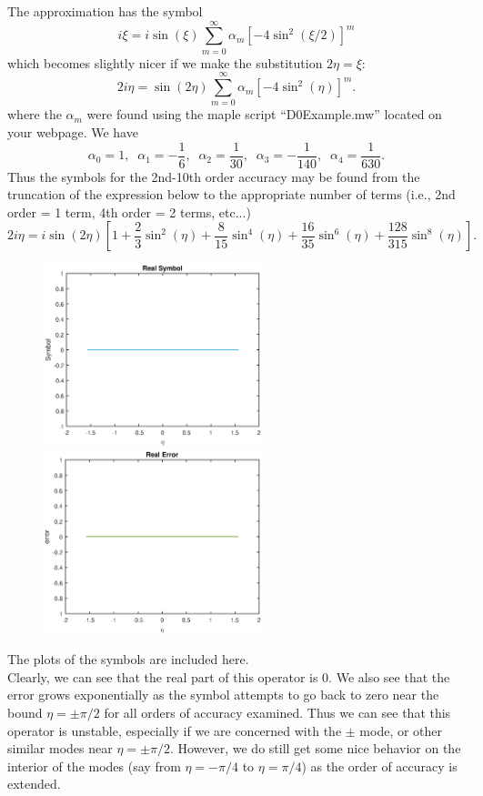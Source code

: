 The approximation has the symbol
$$i\xi =i \sin(\xi)\sum_{m=0}^\infty \alpha_m[-4\sin^2(\xi/2)]^m$$
which becomes slightly nicer if we make the substitution $2\eta = \xi$:
$$2i\eta = \sin(2\eta)\sum_{m=0}^\infty \alpha_m[-4\sin^2(\eta)]^m.$$
where the $\alpha_m$ were found using the maple script ``D0Example.mw'' located on your webpage. We have
$$\alpha_0=1,\;\;\alpha_1 = -\frac{1}{6},\;\; \alpha_2 = \frac{1}{30},\;\; \alpha_3 = -\frac{1}{140},\;\; \alpha_4 = \frac{1}{630}.$$
Thus the symbols for the 2nd-10th order accuracy may be found from the truncation of the expression below to the appropriate number of terms (i.e., 2nd order = 1 term, 4th order = 2 terms, etc...)
$$2i\eta = i\sin(2\eta)\left[1+\frac{2}{3}\sin^2(\eta)+\frac{8}{15}\sin^4(\eta)+\frac{16}{35}\sin^6(\eta)+\frac{128}{315}\sin^8(\eta)\right].$$
\begin{figure}[h]
\centering
\includegraphics[width=2.5in]{real_sym1}
\includegraphics[width=2.5in]{real_err1}
\end{figure}
The plots of the symbols are included here.\\
Clearly, we can see that the real part of this operator is 0. We also see that the error grows exponentially as the symbol attempts to go back to zero near the bound $\eta = \pm\pi/2$ for all orders of accuracy examined. Thus we can see that this operator is unstable, especially if we are concerned with the $\pm$ mode, or other similar modes near $\eta = \pm \pi/2.$ However, we do still get some nice behavior on the interior of the modes (say from $\eta=-\pi/4$ to $\eta=\pi/4$) as the order of accuracy is extended.
